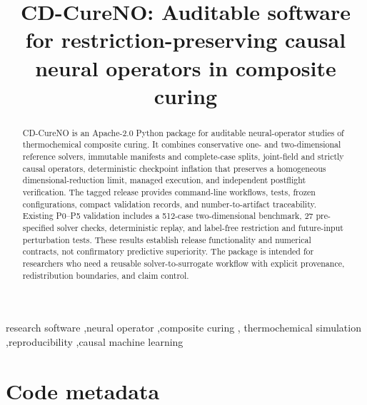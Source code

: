 \documentclass[preprint,12pt]{elsarticle}
\begin{document}
\begin{frontmatter}

\title{CD-CureNO: Auditable software for restriction-preserving causal neural operators in composite curing}

\author[aff1]{\AuthorOne}
\author[aff2]{\AuthorTwo}
\author[aff3]{\AuthorThree{}}
\ead{\CorrespondingEmail}
\address[aff1]{\AffiliationOne}
\address[aff2]{\AffiliationTwo}
\address[aff3]{\AffiliationThree}

\begin{abstract}
CD-CureNO is an Apache-2.0 Python package for auditable neural-operator studies
of thermochemical composite curing. It combines conservative one- and
two-dimensional reference solvers, immutable manifests and complete-case
splits, joint-field and strictly causal operators, deterministic checkpoint
inflation that preserves a homogeneous dimensional-reduction limit, managed
execution, and independent postflight verification. The tagged release
provides command-line workflows, tests, frozen configurations, compact
validation records, and number-to-artifact traceability. Existing P0--P5
validation includes a 512-case two-dimensional benchmark, 27 pre-specified
solver checks, deterministic replay, and label-free restriction and
future-input perturbation tests. These results establish release functionality
and numerical contracts, not confirmatory predictive superiority. The package
is intended for researchers who need a reusable solver-to-surrogate workflow
with explicit provenance, redistribution boundaries, and claim control.
\end{abstract}

\begin{keyword}
research software \sep neural operator \sep composite curing \sep
thermochemical simulation \sep reproducibility \sep causal machine learning
\end{keyword}

\end{frontmatter}

\linenumbers

\section*{Code metadata}
\end{document}

